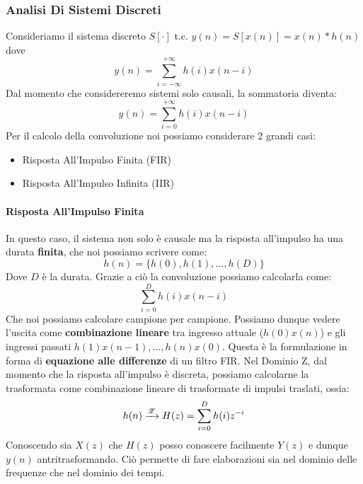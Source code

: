 \subsubsection{Analisi Di Sistemi Discreti}
Consideriamo il sistema discreto $S[\cdot]$ t.c. $y(n) = S[x(n)] = x(n) \ast h(n)$ dove
\begin{equation*}
    y(n) = \sum_{i = -\infty}^{+\infty} h(i) x(n - i)
\end{equation*}
Dal momento che considereremo sistemi solo causali, la sommatoria diventa:
\begin{equation*}
    y(n) = \sum_{i = 0}^{+ \infty} h(i) x(n-i)
\end{equation*}
Per il calcolo della convoluzione noi possiamo considerare 2 grandi casi:
\begin{itemize}
    \item Risposta All'Impulso Finita (FIR)
    \item Risposta All'Impulso Infinita (IIR)
\end{itemize}

\paragraph{Risposta All'Impulso Finita}
In questo caso, il sistema non solo è causale ma la risposta all'impulso ha una durata \textbf{finita}, che noi possiamo scrivere come:
\begin{equation*}
    h(n) = \{h(0), h(1), \dots, h(D)\}
\end{equation*}
Dove $D$ è la durata. Grazie a ciò la convoluzione possiamo calcolarla come:
\begin{equation}
    \sum_{i = 0}^{D} h(i)x(n - i)
\end{equation}
Che noi possiamo calcolare campione per campione. Possiamo dunque vedere l'uscita come \textbf{combinazione lineare} tra ingresso attuale ($h(0)x(n)$)
e gli ingressi passati $h(1)x(n - 1), \dots, h(n)x(0)$. Questa è la formulazione in forma di \textbf{equazione alle differenze} di un filtro FIR.
Nel Dominio Z, dal momento che la risposta all'impulso è discreta, possiamo calcolarne la trasformata come combinazione lineare di trasformate di impulsi traslati, ossia:
\begin{equation}
    h(n) \xrightarrow{\mathscr{Z}} H(z) = \sum_{i = 0}^{D} h(i)z^{-i}
\end{equation}
Conoscendo sia $X(z)$ che $H(z)$ posso conoscere facilmente $Y(z)$ e dunque $y(n)$ antritrasformando. Ciò permette di fare elaborazioni sia nel dominio
delle frequenze che nel dominio dei tempi.

